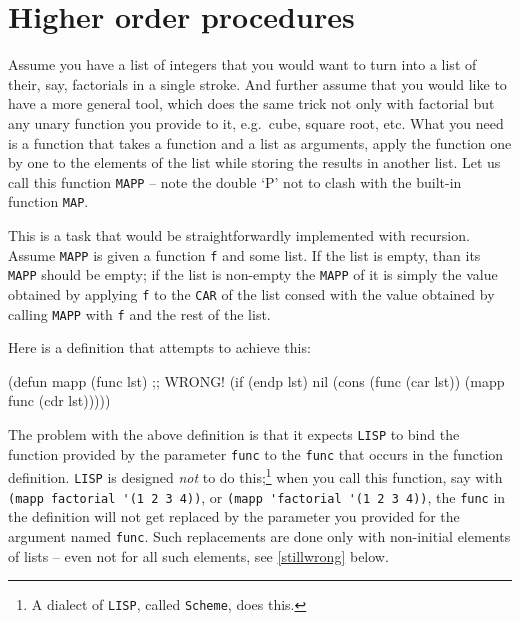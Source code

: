 \documentclass[a4paper,11pt]{article}
\begin{document}
\section{Higher order procedures}

\begin{uenum}
\item Assume you have a list of integers that you would want to turn into a list of their, say, factorials in a single stroke. And further assume that you would like to have a more general tool, which does the same trick not only with factorial but any unary function you provide to it, e.g.\ cube, square root, etc. What you need is a function that takes a function and a list as arguments, apply the function one by one to the elements of the list while storing the results in another list. Let us call this function \Verb+MAPP+ -- note the double `P' not to clash with the built-in function \Verb+MAP+.

\begin{uenumi}
\item This is a task that would be straightforwardly implemented with recursion. Assume \Verb+MAPP+ is given a function \Verb+f+ and some list. If the list is empty, than its \Verb+MAPP+ should be empty; if the list is non-empty the \Verb+MAPP+ of it is simply the value obtained by applying \Verb+f+ to the \Verb+CAR+ of the list consed with the value obtained by calling \Verb+MAPP+ with \Verb+f+ and the rest of the list.
\item Here is a definition that attempts to achieve this:

\begin{lispcode}
(defun mapp (func lst) ;; WRONG!
  (if (endp lst)
	nil
	(cons (func (car lst))
	      (mapp func (cdr lst)))))
\end{lispcode}

\item The problem with the above definition is that it expects \Verb+LISP+ to bind the function provided by the parameter \Verb+func+ to the \Verb+func+ that occurs in the function definition. \Verb+LISP+ is designed \emph{not} to do this;\footnote{A dialect of \Verb+LISP+, called \Verb+Scheme+, does this.} when you call this function, say with \Verb+(mapp factorial '(1 2 3 4))+, or \Verb+(mapp 'factorial '(1 2 3 4))+, the \Verb+func+ in the definition will not get replaced by the parameter you provided for the argument named \Verb+func+. Such replacements are done only with non-initial elements of lists -- even not for all such elements, see \ref{stillwrong} below. 


\end{uenumi}
\end{uenum}
\end{document}
